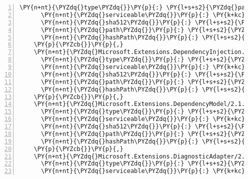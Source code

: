 \begin{Verbatim}[commandchars=\\\{\},numbers=left,firstnumber=1,stepnumber=1,numberblanklines=0]
      \PY{n+nt}{\PYZdq{}type\PYZdq{}}\PY{p}{:} \PY{l+s+s2}{\PYZdq{}package\PYZdq{}}\PY{p}{,}
      \PY{n+nt}{\PYZdq{}serviceable\PYZdq{}}\PY{p}{:} \PY{k+kc}{true}\PY{p}{,}
      \PY{n+nt}{\PYZdq{}sha512\PYZdq{}}\PY{p}{:} \PY{l+s+s2}{\PYZdq{}sha512\PYZhy{}5hLY7wI3JmlNryM/h1GIvk6o+PbX4Kwwdql7kSYaB7jC+h75qk4tzUH3aSIfu1WAorDzXXCMDyEzBK49BBIgZA==\PYZdq{}}\PY{p}{,}
      \PY{n+nt}{\PYZdq{}path\PYZdq{}}\PY{p}{:} \PY{l+s+s2}{\PYZdq{}microsoft.extensions.dependencyinjection/2.1.0\PYZhy{}rc1\PYZhy{}final\PYZdq{}}\PY{p}{,}
      \PY{n+nt}{\PYZdq{}hashPath\PYZdq{}}\PY{p}{:} \PY{l+s+s2}{\PYZdq{}microsoft.extensions.dependencyinjection.2.1.0\PYZhy{}rc1\PYZhy{}final.nupkg.sha512\PYZdq{}}
    \PY{p}{\PYZcb{}}\PY{p}{,}
    \PY{n+nt}{\PYZdq{}Microsoft.Extensions.DependencyInjection.Abstractions/2.1.0\PYZhy{}rc1\PYZhy{}final\PYZdq{}}\PY{p}{:} \PY{p}{\PYZob{}}
      \PY{n+nt}{\PYZdq{}type\PYZdq{}}\PY{p}{:} \PY{l+s+s2}{\PYZdq{}package\PYZdq{}}\PY{p}{,}
      \PY{n+nt}{\PYZdq{}serviceable\PYZdq{}}\PY{p}{:} \PY{k+kc}{true}\PY{p}{,}
      \PY{n+nt}{\PYZdq{}sha512\PYZdq{}}\PY{p}{:} \PY{l+s+s2}{\PYZdq{}sha512\PYZhy{}10h6iXQNPQcVY/wDrLCp3U2veqqjbDmesC6MEMOdLl70/YoCOSAQHCoa35212pYpq0IdNxB5dyiEDqEut61uKw==\PYZdq{}}\PY{p}{,}
      \PY{n+nt}{\PYZdq{}path\PYZdq{}}\PY{p}{:} \PY{l+s+s2}{\PYZdq{}microsoft.extensions.dependencyinjection.abstractions/2.1.0\PYZhy{}rc1\PYZhy{}final\PYZdq{}}\PY{p}{,}
      \PY{n+nt}{\PYZdq{}hashPath\PYZdq{}}\PY{p}{:} \PY{l+s+s2}{\PYZdq{}microsoft.extensions.dependencyinjection.abstractions.2.1.0\PYZhy{}rc1\PYZhy{}final.nupkg.sha512\PYZdq{}}
    \PY{p}{\PYZcb{}}\PY{p}{,}
    \PY{n+nt}{\PYZdq{}Microsoft.Extensions.DependencyModel/2.1.0\PYZhy{}rc1\PYZdq{}}\PY{p}{:} \PY{p}{\PYZob{}}
      \PY{n+nt}{\PYZdq{}type\PYZdq{}}\PY{p}{:} \PY{l+s+s2}{\PYZdq{}package\PYZdq{}}\PY{p}{,}
      \PY{n+nt}{\PYZdq{}serviceable\PYZdq{}}\PY{p}{:} \PY{k+kc}{true}\PY{p}{,}
      \PY{n+nt}{\PYZdq{}sha512\PYZdq{}}\PY{p}{:} \PY{l+s+s2}{\PYZdq{}sha512\PYZhy{}PWGHIL4VcJyeFOjXjXgfWzvRJk6rkQCkHaaTONIMUsoWt7YKljA0D/LDp2t5iTC5VVpbtj8keIIK85+2drF36g==\PYZdq{}}\PY{p}{,}
      \PY{n+nt}{\PYZdq{}path\PYZdq{}}\PY{p}{:} \PY{l+s+s2}{\PYZdq{}microsoft.extensions.dependencymodel/2.1.0\PYZhy{}rc1\PYZdq{}}\PY{p}{,}
      \PY{n+nt}{\PYZdq{}hashPath\PYZdq{}}\PY{p}{:} \PY{l+s+s2}{\PYZdq{}microsoft.extensions.dependencymodel.2.1.0\PYZhy{}rc1.nupkg.sha512\PYZdq{}}
    \PY{p}{\PYZcb{}}\PY{p}{,}
    \PY{n+nt}{\PYZdq{}Microsoft.Extensions.DiagnosticAdapter/2.1.0\PYZhy{}rc1\PYZhy{}final\PYZdq{}}\PY{p}{:} \PY{p}{\PYZob{}}
      \PY{n+nt}{\PYZdq{}type\PYZdq{}}\PY{p}{:} \PY{l+s+s2}{\PYZdq{}package\PYZdq{}}\PY{p}{,}
      \PY{n+nt}{\PYZdq{}serviceable\PYZdq{}}\PY{p}{:} \PY{k+kc}{true}\PY{p}{,}

\end{Verbatim}
